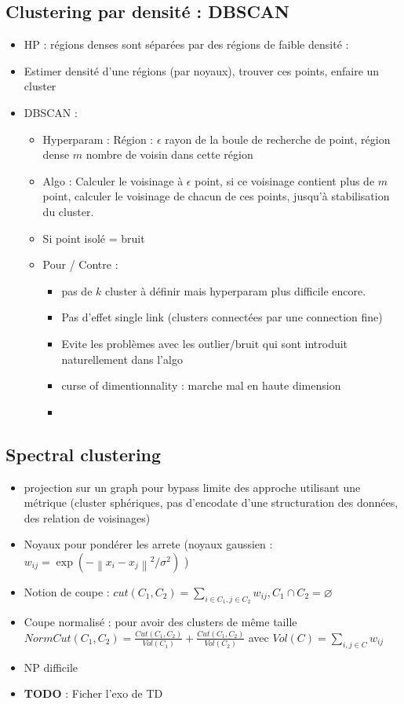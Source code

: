 \documentclass{article}
\begin{document}
\begin{multicols}{2}
\subsection{Clustering par densité : DBSCAN}
\begin{itemize}
    \item HP : régions denses sont séparées par des régions de faible densité : 
    \item Estimer densité d'une régions (par noyaux), trouver ces points, enfaire un cluster
    \item DBSCAN : \begin{itemize}
        \item Hyperparam : Région : $ \epsilon  $ rayon de la boule de recherche de point, région dense $ m $  nombre de voisin dans cette région
        \item Algo : Calculer le voisinage à $ \epsilon  $ point, si ce voisinage contient plus de $ m $ point, calculer le voisinage de chacun de ces points, jusqu'à stabilisation du cluster.
        \item Si point isolé = bruit
        \item Pour / Contre : \begin{itemize}
            \item pas de $ k $ cluster à définir mais hyperparam plus difficile encore. 
            \item Pas d'effet single link (clusters connectées par une connection fine)
            \item Evite les problèmes avec les outlier/bruit qui sont introduit naturellement dans l'algo
            \item curse of dimentionnality : marche mal en haute dimension
            \item 
        \end{itemize}
    \end{itemize}
\end{itemize}

\subsection{Spectral clustering}
\begin{itemize}
    \item projection sur un graph pour bypass limite des approche utilisant une métrique (cluster sphériques, pas d'encodate d'une structuration des données, des relation de voisinages) 
    \item Noyaux pour pondérer les arrete (noyaux gaussien : $ w_{ij} = \exp (- \left\| x_i - x_j \right\|^2 / \sigma ^2 ) $ )
    \item Notion de coupe : $ cut(C_1, C_2) = \sum_{i \in C_1, j \in C_2} w_{ij}, C_1 \cap C_2 = \varnothing $ 
    \item Coupe normalisé : pour avoir des clusters de même taille $ NormCut(C_1, C_2) = \frac{Cut(C_1, C_2)}{Vol(C_1)} + \frac{Cut(C_1, C_2)}{Vol(C_2)} $ avec $ Vol(C) = \sum_{i, j \in C} w_{ij}$  
    \item NP difficile
    \item \textbf{TODO} : Ficher l'exo de TD
\end{itemize}


\end{multicols}
\end{document}

